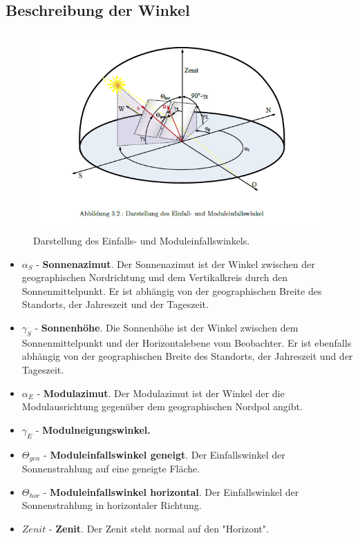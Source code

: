 \documentclass[a4paper,12pt]{article}
\begin{document}
	\subsection{Beschreibung der Winkel}
	\begin{figure}[H]
		\centering
		\includegraphics[width=12cm]{img/Winkel}
		\caption{Darstellung des Einfalls- und Moduleinfallswinkels.}
	\end{figure}
	\begin{itemize}
		\item $\alpha_S$ - \textbf{Sonnenazimut}. Der Sonnenazimut ist der Winkel zwischen der geographischen Nordrichtung und dem Vertikalkreis durch den Sonnenmittelpunkt. Er ist abhängig von der geographischen Breite des Standorts, der Jahreszeit und der Tageszeit.
		\item $\gamma_S$ - \textbf{Sonnenhöhe}. Die Sonnenhöhe ist der Winkel zwischen dem Sonnenmittelpunkt und der Horizontalebene vom Beobachter. Er ist ebenfalls abhängig von der geographischen Breite des Standorts, der Jahreszeit und der Tageszeit. 
		\item $\alpha_E$ - \textbf{Modulazimut}. Der Modulazimut ist der Winkel der die Modulausrichtung gegenüber dem geographischen Nordpol angibt.
		\item $\gamma_E$ - \textbf{Modulneigungswinkel.}
		\item $\Theta_{gen}$ - \textbf{Moduleinfallswinkel geneigt}. Der Einfallswinkel der Sonnenstrahlung auf eine geneigte Fläche.
		\item $\Theta_{hor}$ - \textbf{Moduleinfallswinkel horizontal}. Der Einfallswinkel der Sonnenstrahlung in horizontaler Richtung.
		\item $Zenit$ - \textbf{Zenit}. Der Zenit steht normal auf den "Horizont".
	\end{itemize}
\end{document}
